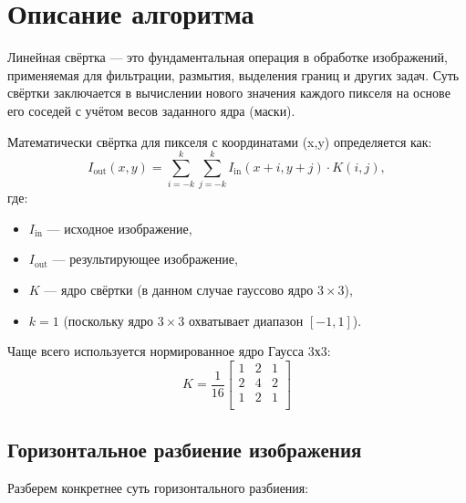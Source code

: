 \documentclass[12pt]{article}
\begin{document}
\section{Описание алгоритма}

\hspace*{1.25em}Линейная свёртка — это фундаментальная операция в обработке изображений, применяемая для фильтрации, размытия, выделения границ и других задач. Суть свёртки заключается в вычислении нового значения каждого пикселя на основе его соседей с учётом весов заданного ядра (маски).

Математически свёртка для пикселя с координатами (x,y) определяется как:
\begin{equation}
I_{\text{out}}(x,y) = \sum_{i=-k}^{k} \sum_{j=-k}^{k} I_{\text{in}}(x+i,y+j) \cdot K(i,j),
\end{equation}
\noindent где:

\begin{itemize}
    \item $I_{\text{in}}$ --- исходное изображение,
    \item $I_{\text{out}}$ --- результирующее изображение,
    \item $K$ --- ядро свёртки (в данном случае гауссово ядро $3\times3$),
    \item $k=1$ (поскольку ядро $3\times3$ охватывает диапазон $[-1,1]$).
\end{itemize}
\hspace*{1.25em} Чаще всего используется нормированное ядро Гаусса 3х3:
\begin{equation}
K = \frac{1}{16}
\begin{bmatrix}
1 & 2 & 1 \\
2 & 4 & 2 \\
1 & 2 & 1 \\
\end{bmatrix}
\end{equation}

\subsection{Горизонтальное разбиение изображения}

\hspace*{1.25em}Разберем конкретнее суть горизонтального разбиения:
\end{document}
